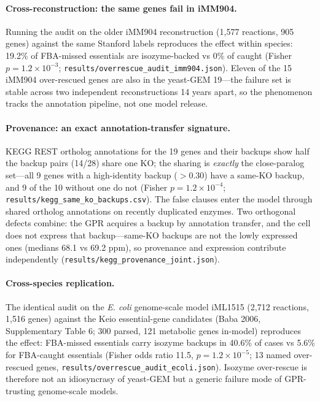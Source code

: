 \documentclass[12pt]{article}
\begin{document}
\paragraph{Cross-reconstruction: the same genes fail in iMM904.}
Running the audit on the older iMM904 reconstruction (1{,}577 reactions,
905 genes) against the same Stanford labels reproduces the effect within
species: 19.2\% of FBA-missed essentials are isozyme-backed vs 0\% of
caught (Fisher $p=1.2\times10^{-3}$;
\texttt{results/overrescue\_audit\_imm904.json}). Eleven of the 15
iMM904 over-rescued genes are also in the yeast-GEM 19---the failure set
is stable across two independent reconstructions 14 years apart, so the
phenomenon tracks the annotation pipeline, not one model release.

\paragraph{Provenance: an exact annotation-transfer signature.}
KEGG REST ortholog annotations for the 19 genes and their backups show
half the backup pairs (14/28) share one KO; the sharing is \emph{exactly}
the close-paralog set---all 9 genes with a high-identity backup
($>0.30$) have a same-KO backup, and 9 of the 10 without one do not
(Fisher $p=1.2\times10^{-4}$; \texttt{results/kegg\_same\_ko\_backups.csv}).
The false clauses enter the model through shared ortholog annotations
on recently duplicated enzymes. Two orthogonal defects combine: the
GPR acquires a backup by annotation transfer, and the cell does not
express that backup---same-KO backups are not the lowly expressed ones
(medians 68.1 vs 69.2 ppm), so provenance and expression contribute
independently (\texttt{results/kegg\_provenance\_joint.json}).

\paragraph{Cross-species replication.}
The identical audit on the \emph{E. coli} genome-scale model iML1515
(2{,}712 reactions, 1{,}516 genes) against the Keio essential-gene
candidates (Baba 2006, Supplementary Table 6; 300 parsed, 121 metabolic
genes in-model) reproduces the effect: FBA-missed essentials carry
isozyme backups in 40.6\% of cases vs 5.6\% for FBA-caught essentials
(Fisher odds ratio 11.5, $p=1.2\times10^{-5}$; 13 named over-rescued
genes, \texttt{results/overrescue\_audit\_ecoli.json}). Isozyme
over-rescue is therefore not an idiosyncrasy of yeast-GEM but a generic
failure mode of GPR-trusting genome-scale models.
\end{document}
